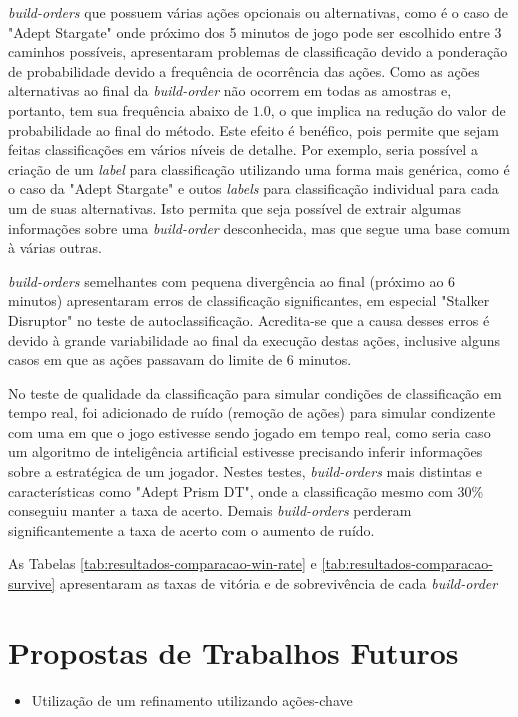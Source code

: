 \textit{\glspl{build-order}} que possuem várias ações opcionais ou alternativas, como é o caso de "Adept Stargate" onde próximo dos 5 minutos de jogo pode ser escolhido entre 3 caminhos possíveis, apresentaram problemas de classificação devido a ponderação de probabilidade devido a frequência de ocorrência das ações. Como as ações alternativas ao final da \textit{\gls{build-order}} não ocorrem em todas as amostras e, portanto, tem sua frequência abaixo de $1.0$, o que implica na redução do valor de probabilidade ao final do método. Este efeito é benéfico, pois permite que sejam feitas classificações em vários níveis de detalhe. Por exemplo, seria possível a criação de um \textit{label} para classificação utilizando uma forma mais genérica, como é o caso da "Adept Stargate" e outos \textit{labels} para classificação individual para cada um de suas alternativas. Isto permita que seja possível de extrair algumas informações sobre uma \textit{\gls{build-order}} desconhecida, mas que segue uma base comum à várias outras.

\textit{\glspl{build-order}} semelhantes com pequena divergência ao final (próximo ao 6 minutos) apresentaram erros de classificação significantes, em especial "Stalker Disruptor" no teste de autoclassificação. Acredita-se que a causa desses erros é devido à grande variabilidade ao final da execução destas ações, inclusive alguns casos em que as ações passavam do limite de 6 minutos.

No teste de qualidade da classificação para simular condições de classificação em tempo real, foi adicionado de ruído (remoção de ações) para simular condizente com uma em que o jogo estivesse sendo jogado em tempo real, como seria caso um algoritmo de inteligência artificial estivesse precisando inferir informações sobre a estratégica de um jogador. Nestes testes, \textit{\glspl{build-order}} mais distintas e características como "Adept Prism DT", onde a classificação mesmo com 30\% conseguiu manter a taxa de acerto. Demais \textit{\glspl{build-order}} perderam significantemente a taxa de acerto com o aumento de ruído.

As Tabelas \ref{tab:resultados-comparacao-win-rate} e \ref{tab:resultados-comparacao-survive} apresentaram as taxas de vitória e de sobrevivência de cada \textit{\gls{build-order}}

	\chapter{Propostas de Trabalhos Futuros}
\begin{itemize}
	\item Utilização de um refinamento utilizando ações-chave
\end{itemize}

